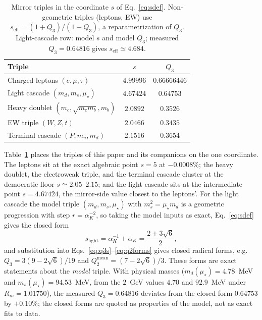 \documentclass[aps,twocolumn,superscriptaddress,nofootinbib,floatfix]{revtex4-2}
\newcommand{\mstar}{\mu_\star}
\newcommand{\alphaK}{\alpha_K}
\begin{document}
\begin{table}[t]
\centering
\caption{Mirror triples in the coordinate $s$ of Eq.~\eqref{eq:sdef}. Non-geometric triples (leptons, EW) use $s_{\mathrm{eff}}=(1+Q_3)/(1-Q_3)$, a reparametrization of $Q_3$. Light-cascade row: model $s$ and model $Q_3$; measured $Q_3=0.64816$ gives $s_{\mathrm{eff}}\simeq4.684$.}
\label{tab:sladder}
\begin{tabular}{lcc}
\toprule
Triple & $s$ & $Q_3$ \\
\midrule
Charged leptons $(e,\mu,\tau)$ & $4.99996$ & $0.66666446$ \\
Light cascade $(m_d, m_s, \mstar)$ & $4.67424$ & $0.64753$ \\
Heavy doublet $(m_c,\sqrt{m_cm_b},m_b)$ & $2.0892$ & $0.3526$ \\
EW triple $(W, Z, t)$ & $2.0466$ & $0.3435$ \\
Terminal cascade $(P, m_u, m_d)$ & $2.1516$ & $0.3654$ \\
\bottomrule
\end{tabular}
\end{table}

Table~\ref{tab:sladder} places the triples of this paper and its companions on the one coordinate. The leptons sit at the exact algebraic point $s=5$ at $-0.0008\%$; the heavy doublet, the electroweak triple, and the terminal cascade cluster at the democratic floor $s\simeq2.05$--$2.15$; and the light cascade sits at the intermediate point $s=4.67424$, the mirror-side value closest to the leptons'. For the light cascade the model triple $(m_d, m_s, \mstar)$ with $m_s^2=\mstar m_d$ is a geometric progression with step $r=\alphaK^{-2}$, so taking the model inputs as exact, Eq.~\eqref{eq:sdef} gives the closed form
\begin{equation}
s_{\mathrm{light}} = \alphaK^{-1} + \alphaK = \frac{2+3\sqrt{6}}{2},
\label{eq:slightclosed}
\end{equation}
and substitution into Eqs.~\eqref{eq:q3s}--\eqref{eq:q2forms} gives closed radical forms, e.g.\ $Q_3 = 3(9-2\sqrt{6})/19$ and $Q_2^{\mathrm{mean}}=(7-2\sqrt{6})/3$. These forms are exact statements about the \emph{model} triple. With physical masses ($m_d(\mstar)=4.78$~MeV and $m_s(\mstar)=94.53$~MeV, from the $2$~GeV values $4.70$ and $92.9$~MeV under $R_m=1.01750$), the measured $Q_3=0.64816$ deviates from the closed form $0.64753$ by $+0.10\%$; the closed forms are quoted as properties of the model, not as exact fits to data.
\end{document}
